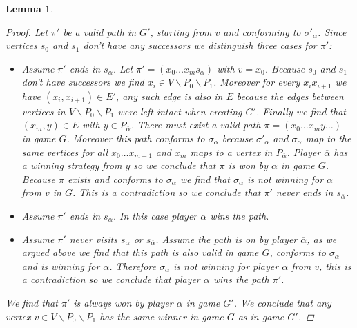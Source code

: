 \documentclass[]{article}
\newtheorem{lemma}[theorem]{Lemma}
\begin{document}
\begin{lemma}
\begin{proof}
			Let $\pi'$ be a valid path in $G'$, starting from $v$ and conforming to $\sigma'_\alpha$. Since vertices $s_0$ and $s_1$ don't have any successors we distinguish three cases for $\pi'$:
			\begin{itemize}
				\item Assume $\pi'$ ends in $s_{\overline{\alpha}}$. Let $\pi' = (x_0\dots x_m s_{\overline{\alpha}})$ with $v = x_0$. Because $s_0$ and $s_1$ don't have successors we find $x_i \in V\backslash P_0 \backslash P_1$. Moreover for every $x_ix_{i+1}$ we have $(x_i,x_{i+1}) \in E'$, any such edge is also in $E$ because the edges between vertices in $V\backslash P_0 \backslash P_1$ were left intact when creating $G'$. Finally we find that $(x_m,y) \in E$ with $y \in P_{\overline{\alpha}}$. There must exist a valid path $\pi = (x_0 \dots x_m y\dots)$ in game $G$. Moreover this path conforms to $\sigma_\alpha$ because $\sigma'_\alpha$ and $\sigma_\alpha$ map to the same vertices for all $x_0\dots x_{m-1}$ and $x_m$ maps to a vertex in $P_{\overline{\alpha}}$. Player $\overline{\alpha}$ has a winning strategy from $y$ so we conclude that $\pi$ is won by $\overline{\alpha}$ in game $G$. Because $\pi$ exists and conforms to $\sigma_\alpha$ we find that $\sigma_\alpha$ is not winning for $\alpha$ from $v$ in $G$. This is a contradiction so we conclude that $\pi'$ never ends in $s_{\overline{\alpha}}$.
				\item Assume $\pi'$ ends in $s_\alpha$. In this case player $\alpha$ wins the path.
				\item Assume $\pi'$ never visits $s_\alpha$ or $s_{\overline{\alpha}}$. Assume the path is on by player $\overline{\alpha}$, as we argued above we find that this path is also valid in game $G$, conforms to $\sigma_\alpha$ and is winning for $\overline{\alpha}$. Therefore $\sigma_\alpha$ is not winning for player $\alpha$ from $v$, this is a contradiction so we conclude that player ${\alpha}$ wins the path $\pi'$.
			\end{itemize}
			We find that $\pi'$ is always won by player $\alpha$ in game $G'$. We conclude that any vertex $v \in V \backslash P_0 \backslash P_1$ has the same winner in game $G$ as in game $G'$.
		\end{proof}
	\end{lemma}
\end{document}

